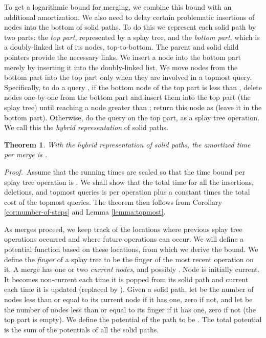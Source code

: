 \documentclass[twoside,leqno,twocolumn]{article}
\newtheorem{theorem}{Theorem}
\newcommand{\proof}{\noindent \emph{Proof.}\ }
\begin{document}
To get a logarithmic bound for merging, we combine this bound with an additional amortization.  We also need to delay certain problematic insertions of nodes into the bottom of solid paths.  To do this we represent each solid path by two parts: the \emph{top part}, represented by a splay tree, and the \emph{bottom part}, which is a doubly-linked list of its nodes, top-to-bottom.  The parent and solid child pointers provide the necessary links.  We insert a node into the bottom part merely by inserting it into the doubly-linked list.  We move nodes from the bottom part into the top part only when they are involved in a topmost query.  Specifically, to do a query , if the bottom node of the top part is less than , delete nodes one-by-one from the bottom part and insert them into the top part (the splay tree) until reaching a node greater than ;  return this node as  (leave it in the bottom part).  Otherwise, do the query on the top part, as a splay tree operation. We call this the \emph{hybrid representation} of solid paths.


\begin{theorem}
\label{theorem:splay}
With the hybrid representation of solid paths, the amortized time per merge is .
\end{theorem}
\proof Assume that the running times are scaled so that the time bound per splay tree operation is .  We shall show that the total time for all the insertions, deletions, and topmost queries is  per operation plus a constant times the total cost of the topmost queries.  The theorem then follows from Corollary \ref{cor:number-of-steps} and Lemma \ref{lemma:topmost}.

As merges proceed, we keep track of the locations where previous splay tree operations occurred and where future operations can occur.  We will define a potential function based on these locations, from which we derive the bound.  We define the \emph{finger} of a splay tree to be the finger of the most recent operation on it. A merge has one or two \emph{current nodes},  and possibly .  Node  is initially current.  It becomes non-current each time it is popped from its solid path and current each time it is updated (replaced by ). Given a solid path, let  be the number of nodes less than or equal to its current node if it has one, zero if not, and let  be the number of nodes less than or equal to its finger if it has one, zero if not (the top part is empty). We define the potential of the path to be .  The total potential is the sum of the potentials of all the solid paths.
\end{document}
